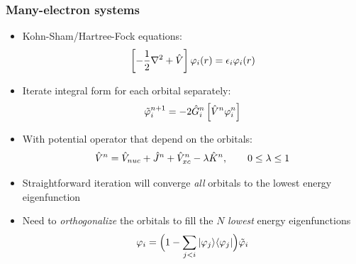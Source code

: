 \begin{frame}
  \frametitle{Many-electron systems}
  \begin{itemize}
    \item Kohn-Sham/Hartree-Fock equations:
      \begin{equation}
        \left[-\frac{1}{2}\nabla^2 + \hat{V}\right] \varphi_i(r) = \epsilon_i \varphi_i(r)
      \end{equation}
    \item Iterate integral form for each orbital separately:
      \begin{equation}
       \tilde{\varphi}_i^{n+1} = -2\hat{G}_i^n\left[\hat{V}^n \varphi_i^n \right]
      \end{equation}
    \item With potential operator that depend on the orbitals:
      \begin{equation}
        \hat{V}^n = \hat{V}_{nuc} + \hat{J}^n + \hat{V}_{xc}^n - \lambda\hat{K}^n, \qquad 0 \leq \lambda \leq 1
      \end{equation}
    \item Straightforward iteration will converge \emph{all} orbitals to the lowest energy eigenfunction
    \vspace{4mm}
    \item Need to \emph{orthogonalize} the orbitals to fill the $N$ \emph{lowest} energy eigenfunctions
      \begin{equation}
        \varphi_i = \Big(1 - \sum_{j<i}|\varphi_j\rangle\langle\varphi_j|\Big)\tilde{\varphi}_i
      \end{equation}
  \end{itemize}
\end{frame}

